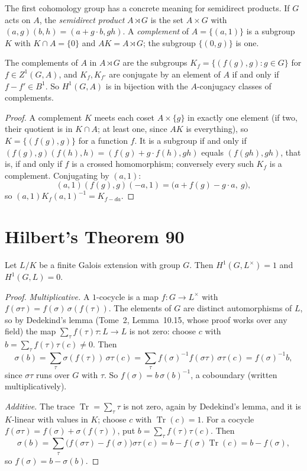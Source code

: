 The first cohomology group has a concrete meaning for semidirect products. If $G$ acts on $A$, the \emph{semidirect product} $A\rtimes G$ is the set $A\times G$ with $(a,g)(b,h)=(a+g\cdot b,gh)$. A
\emph{complement} of $A=\{(a,1)\}$ is a subgroup $K$ with $K\cap A=\{0\}$ and $AK=A\rtimes G$; the subgroup $\{(0,g)\}$ is one.

\begin{proposition}\label{prop:complements}
The complements of $A$ in $A\rtimes G$ are the subgroups $K_f=\{(f(g),g):g\in G\}$ for $f\in Z^1(G,A)$, and $K_f,K_{f'}$ are conjugate by an element of $A$ if and only if $f-f'\in B^1$. So $H^1(G,A)$ is in bijection with the
$A$-conjugacy classes of complements.
\end{proposition}

\begin{proof}
A complement $K$ meets each coset $A\times\{g\}$ in exactly one element (if two, their quotient is in $K\cap A$; at least one, since $AK$ is everything), so $K=\{(f(g),g)\}$ for a function $f$. It is a subgroup if and only if
$(f(g),g)(f(h),h)=(f(g)+g\cdot f(h),gh)$ equals $(f(gh),gh)$, that is, if and only if $f$ is a crossed homomorphism; conversely every such $K_f$ is a complement. Conjugating by $(a,1)$:
\[
(a,1)(f(g),g)(-a,1)=\bigl(a+f(g)-g\cdot a,\ g\bigr),
\]
so $(a,1)K_f(a,1)^{-1}=K_{f-da}$.
\end{proof}

\section{Hilbert's Theorem 90}

\begin{theorem}\label{thm:hilbert90}
Let $L/K$ be a finite Galois extension with group $G$. Then $H^1(G,L^\times)=1$ and $H^1(G,L)=0$.
\end{theorem}

\begin{proof}
\emph{Multiplicative.} A $1$-cocycle is a map $f\colon G\to L^\times$ with $f(\sigma\tau)=f(\sigma)\,\sigma(f(\tau))$. The elements of $G$ are distinct automorphisms of $L$, so by Dedekind's lemma (Tome~2, Lemma~10.15, whose proof
works over any field) the map $\sum_{\tau}f(\tau)\tau\colon L\to L$ is not zero: choose $c$ with $b=\sum_\tau f(\tau)\tau(c)\ne0$. Then
\[
\sigma(b)=\sum_\tau\sigma(f(\tau))\,\sigma\tau(c)=\sum_\tau f(\sigma)^{-1}f(\sigma\tau)\,\sigma\tau(c)=f(\sigma)^{-1}b,
\]
since $\sigma\tau$ runs over $G$ with $\tau$. So $f(\sigma)=b\,\sigma(b)^{-1}$, a coboundary (written multiplicatively).

\emph{Additive.} The trace $\operatorname{Tr}=\sum_\tau\tau$ is not zero, again by Dedekind's lemma, and it is $K$-linear with values in $K$; choose $c$ with $\operatorname{Tr}(c)=1$. For a cocycle $f(\sigma\tau)=f(\sigma)+\sigma(f(\tau))$, put
$b=\sum_\tau f(\tau)\tau(c)$. Then
\[
\sigma(b)=\sum_\tau\bigl(f(\sigma\tau)-f(\sigma)\bigr)\sigma\tau(c)=b-f(\sigma)\operatorname{Tr}(c)=b-f(\sigma),
\]
so $f(\sigma)=b-\sigma(b)$.
\end{proof}

